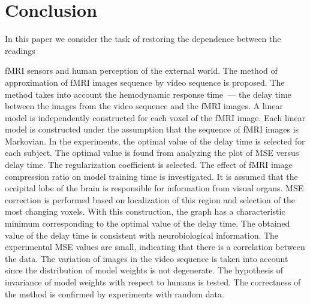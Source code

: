 \documentclass{article}
\begin{document}
\section{Conclusion}

In this paper we consider the task of restoring the dependence between the readings

fMRI sensors and human perception of the external world.
The method of approximation of fMRI images sequence by video sequence is proposed. 
The method takes into account the hemodynamic response time~--- the delay time between the images from the video sequence and the fMRI images. 
A linear model is independently constructed for each voxel of the fMRI image. 
Each linear model is constructed under the assumption that the sequence of fMRI images is Markovian. 
In the experiments, the optimal value of the delay time is selected for each subject. 
The optimal value is found from analyzing the plot of MSE versus delay time.
The regularization coefficient is selected. 
The effect of fMRI image compression ratio on model training time is investigated.
It is assumed that the occipital lobe of the brain is responsible for information from visual organs.
MSE correction is performed based on localization of this region and selection of the most changing voxels. 
With this construction, the graph has a characteristic minimum corresponding to the optimal value of the delay time.
The obtained value of the delay time is consistent with neurobiological information.
The experimental MSE values are small, indicating that there is a correlation between the data. 
The variation of images in the video sequence is taken into account since the distribution of model weights is not degenerate.
The hypothesis of invariance of model weights with respect to humans is tested. 
The correctness of the method is confirmed by experiments with random data.



\end{document}
